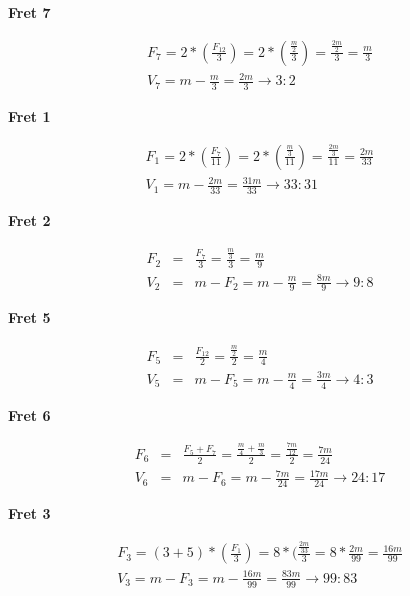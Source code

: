 \textbf{Fret 7}

\begin{eqnarray*}
F_{7} =
    2 * ( \frac{F_{12}}{3} ) =
    2 * ( \frac{\frac{m}{2}}{3} ) =
    \frac{\frac{2m}{2}}{3} =
    \frac{m}{3} \\
    V_{7} = m - \frac{m}{3} = \frac{2m}{3} \to 3:2
\end{eqnarray*}

\textbf{Fret 1}

\begin{eqnarray*}
F_{1} =
    2 * ( \frac{F_{7}}{11} ) =
    2 * ( \frac{\frac{m}{3}}{11} ) =
    \frac{\frac{2m}{3}}{11} =
    \frac{2m}{33} \\
V_{1} =
    m - \frac{2m}{33} =
    \frac{31m}{33}
    \to 33:31
\end{eqnarray*}

\textbf{Fret 2}

\begin{eqnarray*}
    F_{2}
        &=& \frac{F_{7}}{3}
        = \frac{\frac{m}{3}}{3}
        = \frac{m}{9} \\
    V_{2}
        &=& m - F_{2}
        = m - \frac{m}{9}
        = \frac{8m}{9}
        \to 9:8
\end{eqnarray*}

\textbf{Fret 5}

\begin{eqnarray*}\label{Gr-5}
    F_{5}
        &=& \frac{F_{12}}{2}
        = \frac{\frac{m}{2}}{2}
        = \frac{m}{4} \\
    V_{5}
        &=& m - F_{5}
        = m - \frac{m}{4}
        = \frac{3m}{4}
        \to 4:3
\end{eqnarray*}

\textbf{Fret 6}

\begin{eqnarray*}
    F_{6}
        &=& \frac{F_{5} + F_{7}}{2}
        = \frac{\frac{m}{4} + \frac{m}{3}}{2}
        = \frac{\frac{7m}{12}}{2}
        = \frac{7m}{24} \\
    V_{6}
        &=& m - F_{6}
        = m - \frac{7m}{24}
        = \frac{17m}{24}
        \to 24:17
\end{eqnarray*}

\textbf{Fret 3}

\begin{eqnarray*}
F_{3} =
    (3 + 5) * (\frac{F_{1}}{3}) =
    8 * (\frac{\frac{2m}{33}}{3} =
    8 * \frac{2m}{99} =
    \frac{16m}{99} \\
V_{3} =
    m - F_{3} =
    m - \frac{16m}{99} = \frac{83m}{99}
    \to 99:83
\end{eqnarray*}

